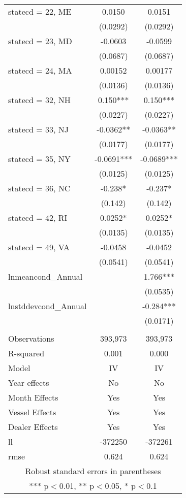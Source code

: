 \begin{tabular}{lcc}
statecd = 22, ME & 0.0150 & 0.0151 \\
 & (0.0292) & (0.0292) \\
statecd = 23, MD & -0.0603 & -0.0599 \\
 & (0.0687) & (0.0687) \\
statecd = 24, MA & 0.00152 & 0.00177 \\
 & (0.0136) & (0.0136) \\
statecd = 32, NH & 0.150*** & 0.150*** \\
 & (0.0227) & (0.0227) \\
statecd = 33, NJ & -0.0362** & -0.0363** \\
 & (0.0177) & (0.0177) \\
statecd = 35, NY & -0.0691*** & -0.0689*** \\
 & (0.0125) & (0.0125) \\
statecd = 36, NC & -0.238* & -0.237* \\
 & (0.142) & (0.142) \\
statecd = 42, RI & 0.0252* & 0.0252* \\
 & (0.0135) & (0.0135) \\
statecd = 49, VA & -0.0458 & -0.0452 \\
 & (0.0541) & (0.0541) \\
lnmeancond\_Annual &  & 1.766*** \\
 &  & (0.0535) \\
lnstddevcond\_Annual &  & -0.284*** \\
 &  & (0.0171) \\
 &  &  \\
Observations & 393,973 & 393,973 \\
R-squared & 0.001 & 0.000 \\
Model & IV & IV \\
Year effects & No & No \\
Month Effects & Yes & Yes \\
Vessel Effects & Yes & Yes \\
Dealer Effects & Yes & Yes \\
ll & -372250 & -372261 \\
 rmse & 0.624 & 0.624 \\ \hline
\multicolumn{3}{c}{ Robust standard errors in parentheses} \\
\multicolumn{3}{c}{ *** p$<$0.01, ** p$<$0.05, * p$<$0.1} \\
\end{tabular}
